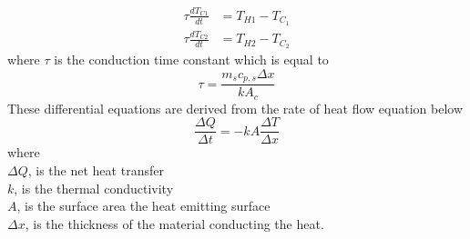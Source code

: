 \begin{align*}
    \tau \frac{d T_{C 1}}{d t} &= T_{H 1}-T_{C_{1}} \\ 
    \tau \frac{d T_{C 2}}{d t} &= T_{H 2}-T_{C_{2}}
\end{align*}
where $\tau$ is the conduction time constant which is equal to 
$$
\tau = \frac{m_{s} c_{p, s} \Delta x}{k A_{c}}
$$
These differential equations are derived from the rate of heat flow equation below
$$
\frac{\Delta Q}{\Delta t}=-k A \frac{\Delta T}{\Delta x}
$$
where \\
$\Delta Q$, is the net heat transfer\\
$k$, is the thermal conductivity\\
$A$, is the surface area the heat emitting surface\\
$\Delta x$, is the thickness of the material conducting the heat.